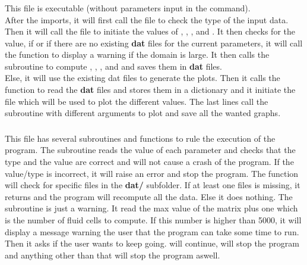 \subsubsection{}
This file is executable (without parameters input in the command).\\
After the imports, it will first call the file  to check the
type of the input data.\\
Then it will call the file  to initiate
the values of , , ,  and .
\smallbreak{}
It then checks for the  value, if  or if there are no
existing \textbf{dat} files for the current parameters, it will call
the function  to display a warning if the domain is large.
It then calls the subroutine  to compute ,
, ,  and  and saves them in
\textbf{dat} files.\\
Else, it will use the existing dat files to generate the plots.
\smallbreak{}
Then it calls the function  to read the \textbf{dat} files and stores
them in a dictionary and it initiate the file  which will be used
to plot the different values.
\smallbreak{}
The last lines call the subroutine  with different arguments
to plot and save all the wanted graphs.

\subsubsection{}
This file has several subroutines and functions to rule the execution of the
program.
\smallbreak{}
The subroutine  reads the value of each parameter and checks
that the type and the value are correct and will not cause a crash of the
program. If the value/type is incorrect, it will raise an error and stop the
program.
\smallbreak{}
The function  will check for specific files in the
\textbf{dat/} subfolder. If at least one files is missing, it returns 
and the program will recompute all the data. Else it does nothing.
\smallbreak{}
The subroutine  is just a warning. It read the max value of
the matrix  plus one which is the number of fluid cells to compute.
If this number is higher than 5000, it will display a message warning the user
that the program can take some time to run. Then it asks if the user wants to
keep going.  will continue,  will stop the program and
anything other than that will stop the program aswell.

